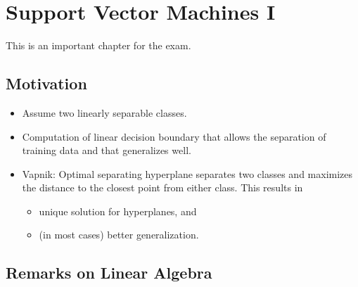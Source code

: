 \newpage
\section{Support Vector Machines I}

This is an important chapter for the exam.\autocite{vapnik2000,hastie2009,bishop2006,schoelkopf2002}

\subsection{Motivation}

  \begin{itemize}
  \item Assume two linearly separable classes. 
  \item Computation of linear decision boundary that allows the separation of 
    training data and that generalizes well.
  \item Vapnik: Optimal separating hyperplane separates two classes and maximizes the distance to the closest point from either class. This results in
    \begin{itemize}
      \item unique solution for hyperplanes, and
      \item (in most cases) better generalization.
    \end{itemize}
  \end{itemize}
  
  \subsection{Remarks on Linear Algebra}

